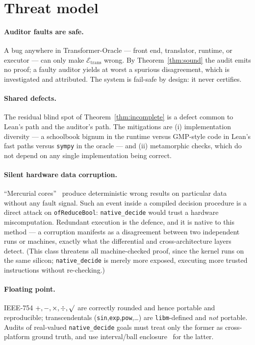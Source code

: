 \documentclass[11pt]{article}
\theoremstyle{definition}
\theoremstyle{plain}
\theoremstyle{remark}
\newcommand{\eval}{\mathcal{E}}
\begin{document}
\section{Threat model}\label{sec:threat}

\paragraph{Auditor faults are safe.} A bug anywhere in Transformer-Oracle --- front end, translator, runtime,
or executor --- can only make $\eval_{\mathrm{trans}}$ wrong. By Theorem~\ref{thm:sound} the audit
emits no proof; a faulty auditor yields at worst a spurious disagreement, which is investigated and
attributed. The system is fail-safe by design: it never certifies.

\paragraph{Shared defects.} The residual blind spot of Theorem~\ref{thm:incomplete} is a defect common
to Lean's path and the auditor's path. The mitigations are (i) implementation diversity --- a
schoolbook bignum in the runtime versus GMP-style code in Lean's fast paths versus \texttt{sympy} in
the oracle --- and (ii) metamorphic checks, which do not depend on any single implementation being
correct.

\paragraph{Silent hardware data corruption.} ``Mercurial cores''~\cite{hochschild2021,dixit2021} produce deterministic wrong results on
particular data without any fault signal. Such an event inside a compiled decision procedure is a direct
attack on \texttt{ofReduceBool}: \texttt{native\_decide} would trust a hardware miscomputation.
Redundant execution is the defence, and it is native to this method --- a corruption manifests as a
disagreement between two independent runs or machines, exactly what the differential and
cross-architecture layers detect. (This class threatens all machine-checked proof, since the kernel runs
on the same silicon; \texttt{native\_decide} is merely more exposed, executing more trusted instructions
without re-checking.)

\paragraph{Floating point.} IEEE-754 $+,-,\times,\div,\surd$ are correctly rounded and hence portable and
reproducible; transcendentals (\texttt{sin},\texttt{exp},\texttt{pow},\dots) are \texttt{libm}-defined
and \emph{not} portable. Audits of real-valued \texttt{native\_decide} goals must treat only the former
as cross-platform ground truth, and use interval/ball enclosure~\cite{johansson2017} for the latter.
\end{document}
